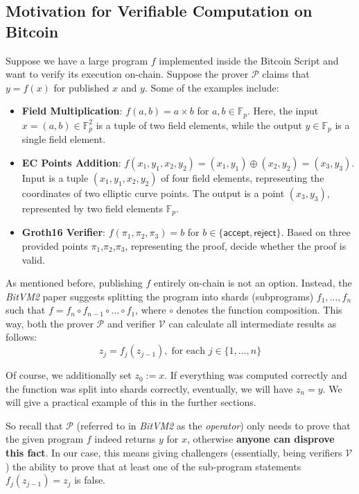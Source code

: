 \documentclass{iacrtrans}
\begin{document}
\subsection{Motivation for Verifiable Computation on Bitcoin}
Suppose we have a large program $f$ implemented inside the Bitcoin Script and
want to verify its execution on-chain. Suppose the prover $\mathcal{P}$ claims
that ${y} = f({x})$ for published ${x}$ and ${y}$. Some of the examples include:
\begin{itemize}
    \item \textbf{Field Multiplication}: $f(a,b) = a \times b$ for $a,b \in
    \mathbb{F}_p$. Here, the input ${x}=(a,b) \in \mathbb{F}_p^2$ is a tuple of
    two field elements, while the output $y \in \mathbb{F}_p$ is a single field
    element.
    \item \textbf{EC Points Addition}: $f(x_1,y_1,x_2,y_2) = (x_1,y_1) \oplus
    (x_2,y_2) = (x_3,y_3)$. Input is a tuple $(x_1,y_1,x_2,y_2)$ of four field
    elements, representing the coordinates of two elliptic curve points. The
    output is a point $(x_3,y_3)$, represented by two field elements
    $\mathbb{F}_p$.
    \item \textbf{Groth16 Verifier}: $f(\pi_1,\pi_2,\pi_3) = b$ for $b \in
    \{\mathsf{accept}, \mathsf{reject}\}$. Based on three provided points
    $\pi_1$,$\pi_2$,$\pi_3$, representing the proof, decide whether the proof is
    valid.
\end{itemize}

As mentioned before, publishing $f$ entirely on-chain is not an option. Instead,
the \textit{BitVM2} paper suggests splitting the program into shards (subprograms) $f_1,\dots,f_n$ such
that $f=f_n \circ f_{n-1} \circ \dots \circ f_1$, where $\circ$ denotes the
function composition. This way, both the prover $\mathcal{P}$ and verifier
$\mathcal{V}$ can calculate all intermediate results as follows:
\begin{equation*}
    {z}_j = f_j({z}_{j-1}), \; \text{for each $j \in \{1,\dots,n\}$}
\end{equation*}

Of course, we additionally set ${z}_0 := {x}$. If everything was computed
correctly and the function was split into shards correctly, eventually, we will
have ${z}_n = {y}$. We will give a practical example of this in the further
sections.

So recall that $\mathcal{P}$ (referred to in \textit{BitVM2} as the \textit{operator})
only needs to prove that the given program $f$ indeed returns ${y}$ for \({x}\),
otherwise \textbf{anyone can disprove this fact}. In our case, this means giving
challengers (essentially, being verifiers $\mathcal{V}$) the ability to prove
that at least one of the sub-program statements \(f_j({z}_{j-1}) = {z}_j\) is
false.
\end{document}
